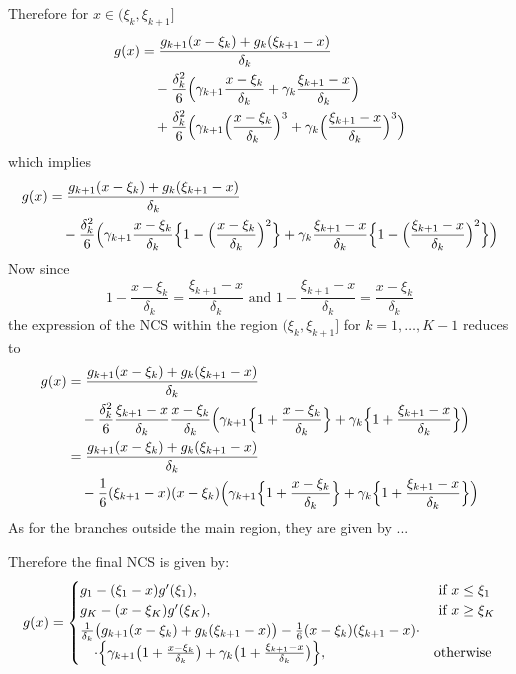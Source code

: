 \documentclass[a4paper]{article}
\begin{document}
Therefore for $x\in (\xi_k,\xi_{k+1}]$
\begin{align*}
	g(x) &= \frac{g_{k+1}(x - \xi_k) + g_k(\xi_{k+1} - x)}{\delta_k}\\
		&\quad- \frac{\delta_k^2}{6} \Bigl( \gamma_{k+1} \frac{x - \xi_k}{\delta_k} + \gamma_k \frac{\xi_{k+1}-x}{\delta_k} \Bigr)\\
		&\quad+ \frac{\delta_k^2}{6} \Bigl( \gamma_{k+1}\Bigl(\frac{x-\xi_k}{\delta_k}\Bigr)^3+\gamma_k\Bigl(\frac{\xi_{k+1}-x}{\delta_k}\Bigr)^3\Bigr)
\end{align*}
which implies
\begin{align*}
	g(x) &= \frac{g_{k+1}(x - \xi_k) + g_k(\xi_{k+1} - x)}{\delta_k}\\
		&\quad- \frac{\delta_k^2}{6} \Bigl(
			\gamma_{k+1}\frac{x - \xi_k}{\delta_k} \Bigl\{1-\Bigl(\frac{x-\xi_k}{\delta_k}\Bigr)^2\Bigr\}
			+\gamma_k\frac{\xi_{k+1}-x}{\delta_k} \Bigl\{1-\Bigl(\frac{\xi_{k+1}-x}{\delta_k}\Bigr)^2\Bigr\}
		\Bigr)
\end{align*}
Now since 
\[
1-\frac{x-\xi_k}{\delta_k} = \frac{\xi_{k+1}-x}{\delta_k }
\text{ and }
1-\frac{\xi_{k+1}-x}{\delta_k} = \frac{x-\xi_k}{\delta_k }
\]
the expression of the NCS within the region $(\xi_k, \xi_{k+1}]$ for $k=1,\ldots, K-1$
reduces to
\begin{align*}
	g(x) &= \frac{g_{k+1}(x - \xi_k) + g_k(\xi_{k+1} - x)}{\delta_k}\\
		&\quad- \frac{\delta_k^2 }{6} \frac{\xi_{k+1}-x}{\delta_k} \frac{x-\xi_k}{\delta_k} \Bigl(
			\gamma_{k+1}\Bigl\{1+\frac{x-\xi_k}{\delta_k}\Bigr\}
			+ \gamma_k\Bigl\{1+\frac{\xi_{k+1}-x}{\delta_k}\Bigr\}
		\Bigr)\\
		&= \frac{g_{k+1}(x - \xi_k) + g_k(\xi_{k+1} - x)}{\delta_k}\\
		&\quad- \frac{1}{6} (\xi_{k+1}-x)(x-\xi_k) \Bigl(
			\gamma_{k+1}\Bigl\{1+\frac{x-\xi_k}{\delta_k}\Bigr\}
			+\gamma_k\Bigl\{1+\frac{\xi_{k+1}-x}{\delta_k}\Bigr\}
		\Bigr)
\end{align*}
As for the branches outside the main region, they are given by ...

Therefore the final NCS is given by:
\[
g(x) = \begin{cases}
	g_1 - (\xi_1-x)g'(\xi_1), &\text{ if } x\leq \xi_1\\
	g_K - (x-\xi_K)g'(\xi_K), &\text{ if } x\geq \xi_K\\
	\frac{1}{\delta_k}\bigl(g_{k+1}(x-\xi_k) + g_k(\xi_{k+1}-x)\bigr)
		- \frac{1}{6}(x-\xi_k)(\xi_{k+1}-x) \cdot \\
		\quad\cdot\Bigl\{ \gamma_{k+1}\bigl( 1+\frac{x-\xi_k}{\delta_k}\bigr)
			+ \gamma_k\bigl( 1+\frac{\xi_{k+1}-x}{\delta_k}\bigr) \Bigr\}, &\text{otherwise}
\end{cases}
\]
\end{document}
